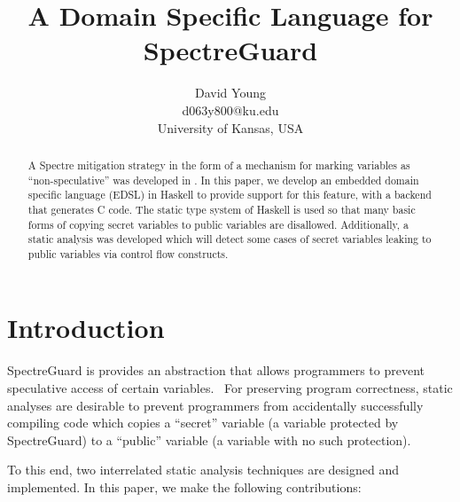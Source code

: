 \documentclass[10pt, conference]{IEEEtran}
\begin{document}
\title{A Domain Specific Language for SpectreGuard}
\author{David Young\\
d063y800@ku.edu\\
University of Kansas, USA\\
}

\maketitle
\thispagestyle{empty}
\begin{abstract}

  A Spectre mitigation strategy in the form of a mechanism for marking variables
  as ``non-speculative'' was developed in \cite{SpectreGuard}. In this paper, we
  develop an embedded domain specific language (EDSL) in Haskell to provide
  support for this feature, with a backend that generates C code. The static
  type system of Haskell is used so that many basic forms of copying secret
  variables to public variables are disallowed. Additionally, a static analysis
  was developed which will detect some cases of secret variables leaking to
  public variables via control flow constructs.

\end{abstract}


\section{Introduction}
SpectreGuard is provides an abstraction that allows programmers to prevent
speculative access of certain variables.~\cite{SpectreGuard} For
preserving program correctness, static analyses are desirable to prevent
programmers from accidentally successfully compiling code which copies a
``secret'' variable (a variable protected by SpectreGuard) to a ``public''
variable (a variable with no such protection).

To this end, two interrelated static analysis techniques are designed and
implemented. In this paper, we make the following contributions:
\end{document}
